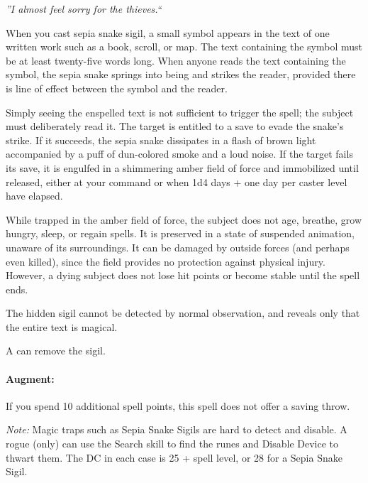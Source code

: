 \emph{''I almost feel sorry for the thieves.``}

When you cast sepia snake sigil, a small symbol appears in the text of one written work such as a book, scroll, or map. 
The text containing the symbol must be at least twenty-five words long. 
When anyone reads the text containing the symbol, the sepia snake springs into being and strikes the reader, 
provided there is line of effect between the symbol and the reader.

Simply seeing the enspelled text is not sufficient to trigger the spell; the subject must deliberately read it. 
The target is entitled to a save to evade the snake's strike. 
If it succeeds, the sepia snake dissipates in a flash of brown light accompanied by a puff of dun-colored smoke and a loud noise. 
If the target fails its save, it is engulfed in a shimmering amber field of force and immobilized until released, 
either at your command or when 1d4 days + one day per caster level have elapsed.

While trapped in the amber field of force, the subject does not age, breathe, grow hungry, sleep, or regain spells. 
It is preserved in a state of suspended animation, unaware of its surroundings. 
It can be damaged by outside forces (and perhaps even killed), since the field provides no protection against physical injury. 
However, a dying subject does not lose hit points or become stable until the spell ends.

The hidden sigil cannot be detected by normal observation, 
and  reveals only that the entire text is magical.

A  can remove the sigil. %

\paragraph{Augment:} If you spend 10 additional spell points, this spell does not offer a saving throw.

\emph{Note:} Magic traps such as Sepia Snake Sigils are hard to detect and disable. 
A rogue (only) can use the Search skill to find the runes and Disable Device to thwart them. 
The DC in each case is 25 + spell level, or 28 for a Sepia Snake Sigil.
